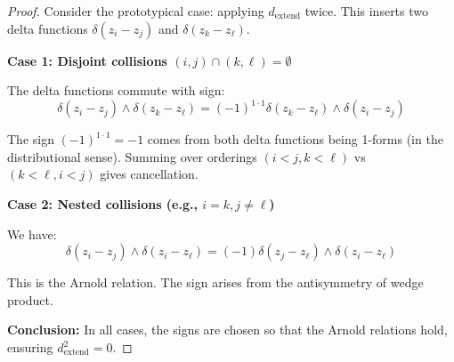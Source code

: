\begin{proof}
Consider the prototypical case: applying $d_{\text{extend}}$ twice. This inserts 
two delta functions $\delta(z_i - z_j)$ and $\delta(z_k - z_\ell)$.

\textbf{Case 1: Disjoint collisions $(i,j) \cap (k,\ell) = \emptyset$}

The delta functions commute with sign:
$$\delta(z_i - z_j) \wedge \delta(z_k - z_\ell) = (-1)^{1 \cdot 1} \delta(z_k - z_\ell) 
\wedge \delta(z_i - z_j)$$

The sign $(-1)^{1 \cdot 1} = -1$ comes from both delta functions being 1-forms 
(in the distributional sense). Summing over orderings $(i<j, k<\ell)$ vs $(k<\ell, i<j)$ 
gives cancellation.

\textbf{Case 2: Nested collisions (e.g., $i=k, j \neq \ell$)}

We have:
$$\delta(z_i - z_j) \wedge \delta(z_i - z_\ell) = (-1) \delta(z_j - z_\ell) 
\wedge \delta(z_i - z_\ell)$$

This is the Arnold relation. The sign arises from the antisymmetry of wedge product.

\textbf{Conclusion:} In all cases, the signs are chosen so that the Arnold relations 
hold, ensuring $d_{\text{extend}}^2 = 0$.
\end{proof}

